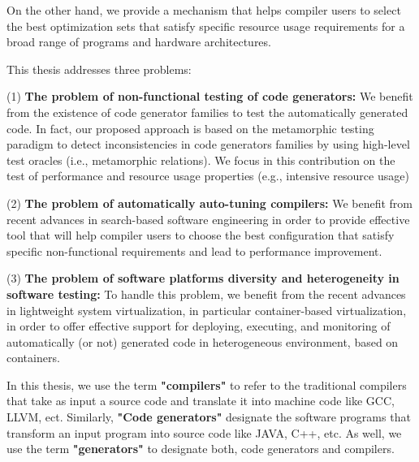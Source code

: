 On the other hand, we provide a mechanism that helps compiler users to select the best optimization sets that satisfy specific resource usage requirements for a broad range of programs and hardware architectures.

This thesis addresses three problems: 
	
	(1) \textbf{The problem of non-functional testing of code generators:} We benefit from the existence of code generator families to test the automatically generated code. In fact, our proposed approach is based on the metamorphic testing paradigm to detect inconsistencies in code generators families by using high-level test oracles (i.e., metamorphic relations). We focus in this contribution on the test of performance and resource usage properties (e.g., intensive resource usage)
	
	(2) \textbf{The problem of automatically auto-tuning compilers:}  We benefit from recent advances in search-based software engineering in order to provide effective tool that will help compiler users to choose the best configuration that satisfy specific non-functional requirements and lead to performance improvement.

	(3) \textbf{The problem of software platforms diversity and heterogeneity in software testing:} To handle this problem, we benefit from the recent advances in lightweight system virtualization, in particular container-based virtualization, in order to offer effective support for deploying, executing, and monitoring of automatically (or not) generated code in heterogeneous environment, based on containers.

In this thesis, we use the term \textbf{"compilers"} to refer to the traditional compilers that take as input a source code and translate it into machine code like GCC, LLVM, ect. Similarly, \textbf{"Code generators"} designate the software programs that transform an input program into source code like JAVA, C++, etc. As well, we use the term \textbf{"generators"} to designate both, code generators and compilers. 

